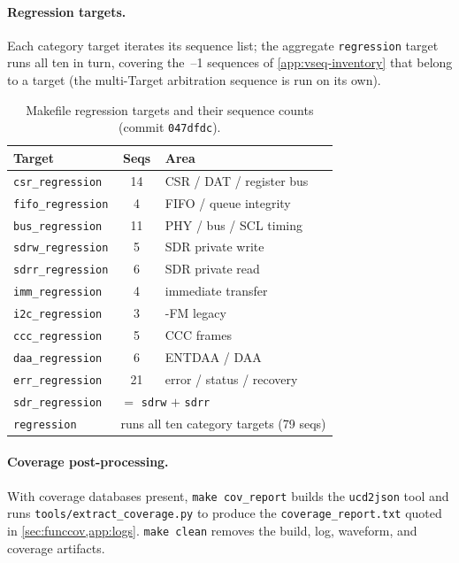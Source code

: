 \paragraph{Regression targets.} Each category target iterates its sequence list; the
aggregate \texttt{regression} target runs all ten in turn, covering the
\RunnableVseqCount{}\,--1 sequences of \cref{app:vseq-inventory} that belong to a target (the
multi-Target arbitration sequence is run on its own).

\begin{table}[!htb]\centering
  \caption{Makefile regression targets and their sequence counts (commit \texttt{047dfdc}).}
  \label{tab:app-make-targets}
  \small
  \begin{tabular}{@{}lcl@{}}
    \toprule
    \textbf{Target} & \textbf{Seqs} & \textbf{Area} \\
    \midrule
    \texttt{csr\_regression}  & 14 & CSR / DAT / register bus \\
    \texttt{fifo\_regression} & 4  & FIFO / queue integrity \\
    \texttt{bus\_regression}  & 11 & PHY / bus / SCL timing \\
    \texttt{sdrw\_regression} & 5  & SDR private write \\
    \texttt{sdrr\_regression} & 6  & SDR private read \\
    \texttt{imm\_regression}  & 4  & immediate transfer \\
    \texttt{i2c\_regression}  & 3  & \iic{}-FM legacy \\
    \texttt{ccc\_regression}  & 5  & CCC frames \\
    \texttt{daa\_regression}  & 6  & ENTDAA / DAA \\
    \texttt{err\_regression}  & 21 & error / status / recovery \\
    \midrule
    \texttt{sdr\_regression}  & \multicolumn{2}{l}{$=$ \texttt{sdrw} $+$ \texttt{sdrr}} \\
    \texttt{regression}       & \multicolumn{2}{l}{runs all ten category targets (79 seqs)} \\
    \bottomrule
  \end{tabular}
\end{table}

\paragraph{Coverage post-processing.} With coverage databases present, \texttt{make cov\_report}
builds the \texttt{ucd2json} tool and runs \texttt{tools/extract\_coverage.py} to produce the
\texttt{coverage\_report.txt} quoted in \cref{sec:funccov,app:logs}. \texttt{make clean}
removes the build, log, waveform, and coverage artifacts.


